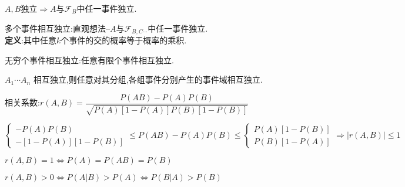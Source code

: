 $ A,B$独立$ \Rightarrow A与\mathcal{F}_B$中任一事件独立.

多个事件相互独立:直观想法--$ A与\mathcal{F}_{B,C\cdots}$中任一事件独立.
\\

{\bf 定义}:其中任意$ k$个事件的交的概率等于概率的乘积.

无穷个事件相互独立:任意有限个事件相互独立.

$ A_1\cdots A_n$ 相互独立,则任意对其分组,各组事件分别产生的事件域相互独立.

相关系数:$ r(A,B)=\dfrac{P(AB)- P(A)P(B)}{\sqrt{P(A)[1-P(A)]P(B)[1-P(B)]}}$

$ \left \{\begin{matrix}-P(A)P(B)\\  -[1-P(A)][1-P(B)]\end{matrix} \right . \le P(AB)-P(A)P(B) \le \left \{ \begin{matrix} P(A)[1-P(B)]\\ P(B)[1-P(A)]\end{matrix}\right .
			\Rightarrow  |r(A,B)| \le 1$

$ r(A,B)=1\Leftrightarrow P(A)=P(AB)=P(B)$

$ r(A,B)>0\Leftrightarrow P(A|B)>P(A)\Leftrightarrow P(B|A)>P(B)$
